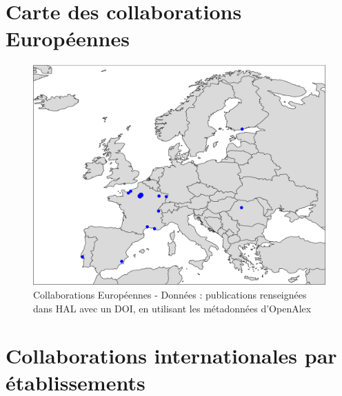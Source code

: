 \documentclass[french, 11pt]{dibiso/biso}
\begin{document}






\pagebreak

\section{Carte des collaborations Européennes}

\begin{figure}[!h]
  \includegraphics[width=\textwidth]{figures/collaboration_map_europe.pdf}
  \caption{Collaborations Européennes - Données : publications renseignées dans HAL avec un DOI, en utilisant les métadonnées d'OpenAlex}
  \label{fig_collab_map_europe}
\end{figure}







\pagebreak

\section{Collaborations internationales par établissements}
\end{document}
